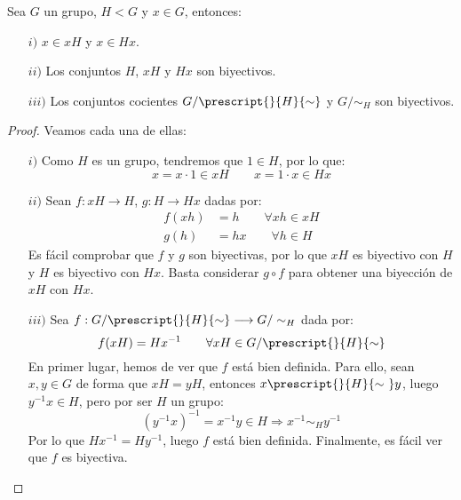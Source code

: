 \begin{prop}\label{prop:biyecciones_conj_cocientes}
    Sea $G$ un grupo, $H < G$ y $x\in G$, entonces:
    \begin{enumerate}
        \item[$i)$] $x\in xH$ y $x\in Hx$.
        \item[$ii)$] Los conjuntos $H$, $xH$ y $Hx$ son biyectivos.
        \item[$iii)$] Los conjuntos cocientes $G/\prescript{}{H}{\sim}$ y $G/\sim_H$ son biyectivos.
    \end{enumerate}
    \begin{proof} Veamos cada una de ellas:
        \begin{enumerate}
            \item[$i)$] Como $H$ es un grupo, tendremos que $1\in H$, por lo que:
                \begin{equation*}
                    x = x\cdot 1 \in xH \qquad x = 1\cdot x \in Hx
                \end{equation*}
            \item[$ii)$] Sean $f:xH\longrightarrow H$, $g:H\longrightarrow Hx$ dadas por:
                \begin{align*}
                    f(xh) &= h \qquad \forall xh\in xH \\
                    g(h) &= hx \qquad \forall h\in H
                \end{align*}
                Es fácil comprobar que $f$ y $g$ son biyectivas, por lo que $xH$ es biyectivo con $H$ y $H$ es biyectivo con $Hx$. Basta considerar $g\circ f$ para obtener una biyección de $xH$ con $Hx$.
            \item[$iii)$] Sea $f:G/\prescript{}{H}{\sim}\longrightarrow G/\sim_H$ dada por:
                \begin{equation*}
                    f(xH) = Hx^{-1} \qquad \forall xH \in G/\prescript{}{H}{\sim}
                \end{equation*}
                En primer lugar, hemos de ver que $f$ está bien definida. Para ello, sean $x,y\in G$ de forma que $xH = yH$, entonces $x\prescript{}{H}{\sim\ } y$, luego $y^{-1}x\in H$, pero por ser $H$ un grupo:
                \begin{equation*}
                    {(y^{-1}x)}^{-1} = x^{-1}y \in H \Longrightarrow x^{-1}\sim_H y^{-1}
                \end{equation*}
                Por lo que $Hx^{-1} = Hy^{-1}$, luego $f$ está bien definida. Finalmente, es fácil ver que $f$ es biyectiva. \qedhere
        \end{enumerate}
    \end{proof}
\end{prop}

